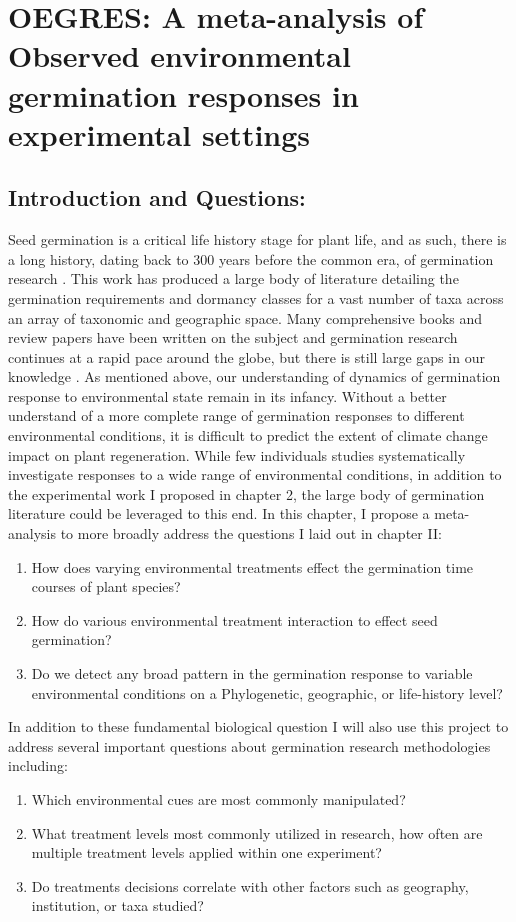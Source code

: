 \documentclass{article}\usepackage[]{graphicx}\usepackage[]{color}
\begin{document}
\section*{OEGRES: A meta-analysis of Observed environmental germination responses in experimental settings}
\subsection*{Introduction and Questions:}
\indent\indent Seed germination is a critical life history stage for plant life, and as such, there is a long history, dating back to 300 years before the common era, of germination research \citep{Baskin2014}. This work has produced a large body of literature detailing the germination requirements and dormancy classes for a vast number of taxa across an array of taxonomic and geographic space. Many comprehensive books and review papers have been written on the subject and germination research continues at a rapid pace around the globe, but there is still large gaps in our knowledge \citep{Baskin2014}. As mentioned above, our understanding of  dynamics of germination response to environmental state remain in its infancy.  Without a better understand of a more complete range of germination responses to different environmental conditions, it is difficult to predict the extent of climate change impact on plant regeneration. While few individuals studies systematically investigate responses to a wide range of environmental conditions, in addition to the experimental work I proposed in chapter 2, the large body of germination literature could be leveraged to this end. In this chapter, I propose a meta-analysis to more broadly address the questions I laid out in chapter II:
\begin{enumerate}
\item How does varying environmental treatments effect the germination time courses of plant species?
\item How do various environmental treatment interaction to effect seed germination?
\item Do we detect any broad pattern in the germination response to variable environmental conditions on a Phylogenetic, geographic, or life-history level?
\end{enumerate}
\indent\indent In addition to these fundamental biological question I will also use this project to address several important questions about germination research methodologies including:
\begin{enumerate}
\item Which environmental cues are most commonly manipulated?
\item What treatment levels most commonly utilized in research, how often are multiple treatment levels applied within one experiment?
\item Do treatments decisions correlate with other factors such as geography, institution, or taxa studied?
\end{enumerate}
\end{document}
